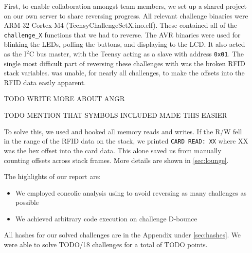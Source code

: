 First, to enable collaboration amongst team members, we set up a \ghidra shared
project on our own server to share reversing progress.
All relevant challenge binaries were ARM-32 Cortex-M4 (TeensyChallengeSetX.ino.elf).
These contained all of the \texttt{challenge\_X} functions that we had to reverse.
The AVR binaries were used for blinking the LEDs, polling the buttons, and displaying to the LCD. It also acted as the I$^{2}$C bus master, with the Teensy acting as a slave with address \texttt{0x01}.
The single most
difficult part of reversing these challenges with \ghidra was the broken RFID
stack variables. \ghidra was unable, for nearly all challenges, to make the
offsets into the RFID data easily apparent.

TODO WRITE MORE ABOUT ANGR

TODO MENTION THAT SYMBOLS INCLUDED MADE THIS EASIER

To solve this, we used \angr and
hooked all memory reads and writes. If the R/W fell in the range of the RFID
data on the stack, we printed \texttt{CARD READ: XX} where XX was the hex
offset into the card data. This alone saved us from manually counting offsets
across stack frames. More details are shown in \autoref{sec:lounge}.

\vspace{0.5cm}
\noindent The highlights of our report are:
\begin{itemize}
  \item We employed concolic analysis using \angr to avoid reversing as many challenges as possible
  \item We achieved arbitrary code execution on challenge \mbox{D-bounce}
\end{itemize}

All hashes for our solved challenges are in the Appendix under \autoref{sec:hashes}.
We were able to solve TODO/18 challenges for a total of TODO points.


